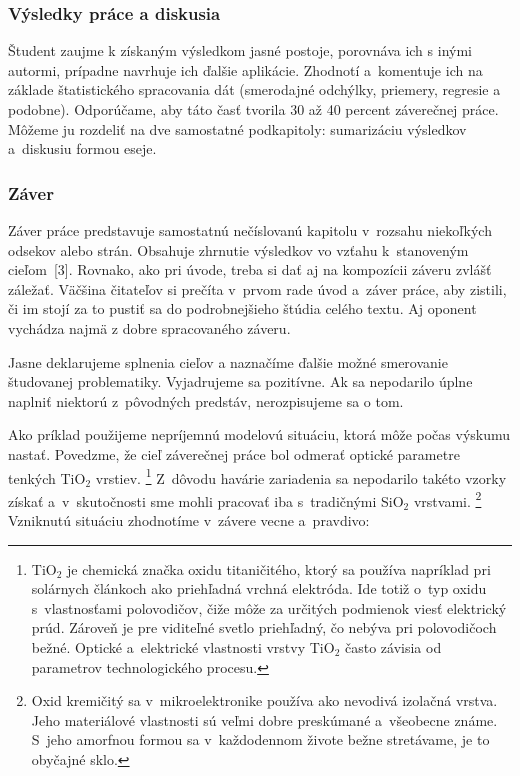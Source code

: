 \documentclass[../../../thesis.tex]{subfiles}
\begin{document}
\subsubsection*{\normalsize Výsledky práce a diskusia}
Študent zaujme k získaným výsledkom jasné postoje,
porovnáva ich s inými autormi, prípadne navrhuje ich ďalšie aplikácie.
Zhodnotí a~komentuje ich na základe štatistického spracovania dát (smerodajné odchýlky, priemery, regresie a podobne).
Odporúčame, aby táto časť tvorila 30 až 40 percent záverečnej práce.
Môžeme ju rozdeliť na dve samostatné podkapitoly: sumarizáciu výsledkov a~diskusiu formou eseje.

\subsubsection{Záver}
Záver práce predstavuje samostatnú nečíslovanú kapitolu
v~rozsahu niekoľkých odsekov alebo strán.
Obsahuje zhrnutie výsledkov vo vzťahu k~stanoveným cieľom~[3].
Rovnako, ako pri úvode, treba si dať
aj na kompozícii záveru zvlášť záležať.
Väčšina čitateľov si prečíta v~prvom rade úvod a~záver práce,
aby zistili, či im stojí za to pustiť sa do podrobnejšieho
štúdia celého textu.
Aj oponent vychádza najmä z dobre spracovaného záveru.

Jasne deklarujeme splnenia cieľov a naznačíme ďalšie možné smerovanie študovanej problematiky. Vyjadrujeme sa pozitívne. Ak sa nepodarilo úplne naplniť niektorú z~pôvodných predstáv, nerozpisujeme sa o tom.

Ako príklad použijeme nepríjemnú modelovú situáciu,
ktorá môže počas výskumu nastať.
Povedzme, že cieľ záverečnej práce bol odmerať
optické parametre tenkých TiO$_2$ vrstiev.%
\footnote{TiO$_2$ je chemická značka oxidu titaničitého,
ktorý sa používa napríklad pri solárnych článkoch
ako priehľadná vrchná elektróda.
Ide totiž o~typ oxidu s~vlastnosťami polovodičov,
čiže môže za určitých podmienok viesť elektrický prúd.
Zároveň je pre viditeľné svetlo priehľadný,
čo nebýva pri polovodičoch bežné.
Optické a~elektrické vlastnosti vrstvy TiO$_2$
často závisia od parametrov technologického procesu.}
Z~dôvodu havárie zariadenia sa nepodarilo takéto vzorky získať
a~v~skutočnosti sme mohli pracovať iba
s~tradičnými SiO$_2$ vrstvami.%
\footnote{Oxid kremičitý sa v~mikroelektronike používa
ako nevodivá izolačná vrstva.
Jeho materiálové vlastnosti sú veľmi dobre preskúmané
a~všeobecne známe.
S~jeho amorfnou formou sa v~každodennom živote bežne stretávame,
je to obyčajné sklo.}
Vzniknutú situáciu zhodnotíme v~závere vecne a~pravdivo:
\end{document}
